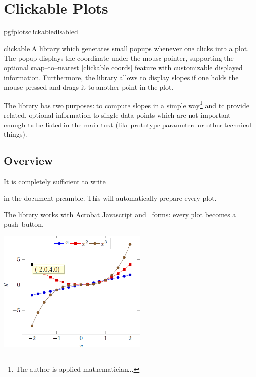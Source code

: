 \section{Clickable Plots}
	\expandafter\ifx\csname pgfplotsclickabledisabled\endcsname\relax
	\else
	\fi
\begin{pgfplotslibrary}{clickable}
	A library which generates small popups whenever one clicks into a plot. The popup displays the coordinate under the mouse pointer, supporting the optional snap--to--nearest |clickable coords| feature with customizable displayed information. Furthermore, the library allows to display slopes if one holds the mouse pressed and drags it to another point in the plot.

	The library has two purposes: to compute slopes in a simple way\footnote{The author is applied mathematician...} and to provide related, optional information to single data points which are not important enough to be listed in the main text (like prototype parameters or other technical things).
\end{pgfplotslibrary}


\subsection{Overview}
	It is completely sufficient to write 
\begin{codeexample}
\end{codeexample}
	\noindent in the document preamble. This will automatically prepare every plot.

	The library works with Acrobat Javascript and \pdf\ forms: every plot becomes a push--button. 

	\includegraphics[height=6cm]{figures/pgfplotsclickable-fig1.png}
	\hfill

